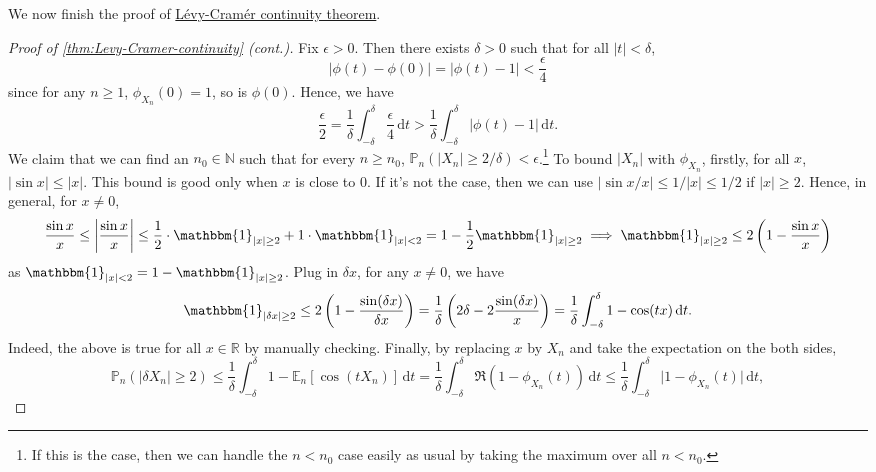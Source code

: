 We now finish the proof of \hyperref[thm:Levy-Cramer-continuity]{Lévy-Cramér continuity theorem}.

\begin{proof}[Proof of \autoref{thm:Levy-Cramer-continuity} (cont.)]\label{pf:thm:Levy-Cramer-continuity}
	Fix \(\epsilon > 0\). Then there exists \(\delta > 0\) such that for all \(\vert t \vert < \delta \),
	\[
		\vert \phi (t) - \phi (0) \vert
		= \vert \phi (t) - 1 \vert
		< \frac{\epsilon }{4}
	\]
	since for any \(n \geq 1\), \(\phi _{X_n}(0) = 1\), so is \(\phi (0)\). Hence, we have
	\[
		\frac{\epsilon }{2}
		= \frac{1}{\delta } \int_{-\delta }^{\delta } \frac{\epsilon }{4} \,\mathrm{d}t
		> \frac{1}{\delta } \int_{-\delta }^{\delta } \vert \phi (t) - 1 \vert \,\mathrm{d}t .
	\]
	We claim that we can find an \(n_0 \in \mathbb{N} \) such that for every \(n \geq n_0\), \(\mathbb{P} _{n}(\vert X_n \vert \geq 2 / \delta ) < \epsilon \).\footnote{If this is the case, then we can handle the \(n < n_0\) case easily as usual by taking the maximum over all \(n < n_0\).} To bound \(\vert X_n \vert \) with \(\phi _{X_n}\), firstly, for all \(x\), \(\vert \sin x \vert \leq \vert x \vert \). This bound is good only when \(x\) is close to \(0\). If it's not the case, then we can use \(\vert \sin x / x \vert \leq 1 / \vert x \vert \leq 1 / 2\) if \(\vert x \vert \geq 2\). Hence, in general, for \(x \neq 0\),
	\[
		\frac{\sin x}{x}
		\leq \left\vert \frac{\sin x}{x} \right\vert
		\leq \frac{1}{2} \cdot \mathbbm{1}_{\vert x \vert \geq 2} + 1 \cdot \mathbbm{1}_{\vert x \vert < 2}
		= 1 - \frac{1}{2} \mathbbm{1}_{\vert x \vert \geq 2}
		\implies \mathbbm{1}_{\vert x \vert \geq 2}
		\leq 2 \left( 1 - \frac{\sin x}{x} \right)
	\]
	as \(\mathbbm{1}_{\vert x \vert < 2} = 1 - \mathbbm{1}_{\vert x \vert \geq 2} \). Plug in \(\delta x\), for any \(x \neq 0\), we have
	\[
		\mathbbm{1}_{\vert \delta x \vert \geq 2}
		\leq 2 \left( 1 - \frac{\sin (\delta x)}{\delta x} \right)
		= \frac{1}{\delta } \left( 2\delta - 2 \frac{\sin (\delta x)}{x} \right)
		= \frac{1}{\delta } \int_{-\delta }^{\delta } 1 - \cos (tx) \,\mathrm{d}t .
	\]
	Indeed, the above is true for all \(x \in \mathbb{R} \) by manually checking. Finally, by replacing \(x\) by \(X_n\) and take the expectation on the both sides,
	\[
		\mathbb{P} _{n}(\vert \delta X_n \vert \geq 2)
		\leq \frac{1}{\delta } \int_{-\delta }^{\delta } 1 - \mathbb{E}_{n}[\cos (t X_n)] \,\mathrm{d}t
		= \frac{1}{\delta } \int_{-\delta }^{\delta } \Re (1 - \phi _{X_n}(t)) \,\mathrm{d}t
		\leq \frac{1}{\delta } \int_{-\delta }^{\delta } \vert 1 - \phi _{X_n}(t) \vert  \,\mathrm{d}t,
\]
\end{proof}
